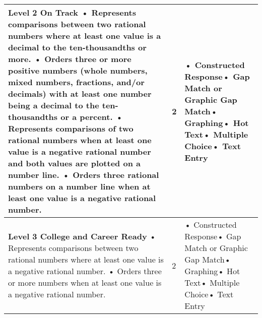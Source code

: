 \documentclass[11pt, English]{article}
\begin{document}
\begin{longtable}{|p{11.0cm}|p{1.8cm}|p{3.7cm}|}
\textbf{Level 2 On Track}\newline
• Represents comparisons between two rational numbers where at least one value is a decimal to the ten-thousandths or more. \newline• Orders three or more positive numbers (whole numbers, mixed numbers, fractions, and/or decimals) with at least one number being a decimal to the ten-thousandths or a percent. \newline• Represents comparisons of two rational numbers when at least one value is a negative rational number and both values are plotted on a number line. \newline• Orders three rational numbers on a number line when at least one value is a negative rational number. \newline

 & \hfil{2}
 &• Constructed Response\newline• Gap Match or Graphic Gap Match\newline• Graphing\newline• Hot Text\newline• Multiple Choice\newline• Text Entry\\
\hline


 
\textbf{Level 3 College and Career Ready}\newline
• Represents comparisons between two rational numbers where at least one value is a negative rational number. \newline• Orders three or more numbers when at least one value is a negative rational number. \newline

& \hfil{2}
&• Constructed Response\newline• Gap Match or Graphic Gap Match\newline• Graphing\newline• Hot Text\newline• Multiple Choice\newline• Text Entry\\
\hline 


\end{longtable}
\end{document}
